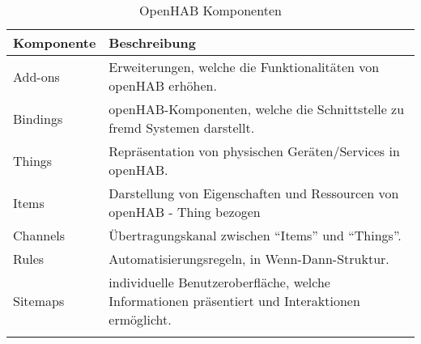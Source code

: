 \begin{longtable}{| p{4cm} | p{11cm}|}
	\hline
	\textbf{Komponente} & \textbf{Beschreibung} \\
	\hline \hline
	\centering Add-ons & Erweiterungen, welche die Funktionalitäten von openHAB erhöhen. \\
	\hline
	\centering Bindings & openHAB-Komponenten, welche die Schnittstelle zu fremd Systemen darstellt.  \\
	\hline
	\centering Things & Repräsentation von physischen Geräten/Services in openHAB. \\
	\hline
	\centering Items & Darstellung von Eigenschaften und Ressourcen von openHAB - Thing bezogen \\
	\hline
	\centering Channels & Übertragungskanal zwischen "`Items"' und "`Things"'. \\
	\hline
	\centering Rules & Automatisierungsregeln, in Wenn-Dann-Struktur.\\
	\hline
	\centering Sitemaps & individuelle Benutzeroberfläche, welche Informationen präsentiert und Interaktionen ermöglicht.\\
	\hline
	\caption{OpenHAB Komponenten}
	\label{table:openhub-components}
\end{longtable}

